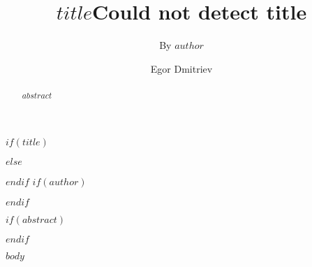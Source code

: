 \documentclass[acmsmall,nonacm]{acmart}
\begin{document}
$if(title)$
\title{$title$}
$else$
\title{Could not detect title}
$endif$
$if(author)$
\subtitle{By $author$}
$endif$


\author{Egor Dmitriev}


$if(abstract)$
\begin{abstract}
$abstract$
\end{abstract}
$endif$

\maketitle

\renewcommand{\shortauthors}{$author.name$}




$body$
\end{document}
